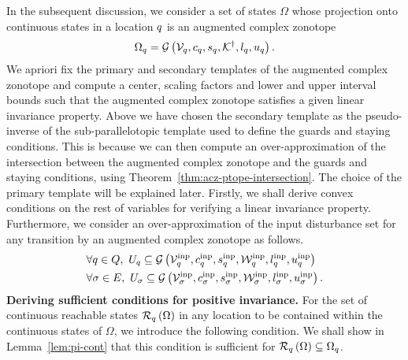 In the subsequent discussion, we consider a set of states $\Omega$ whose
projection onto continuous states in a location $q$ is an augmented
complex zonotope
%
\[
\Omega_q=\mathcal{G}\left(\mathcal{V}_q,c_q,s_q,{\mathcal{K}}^\dagger,l_q,u_q\right).
\]
%
We apriori fix the primary and secondary templates of the augmented
complex zonotope and compute a center, scaling factors and lower and
upper interval bounds such that the augmented complex zonotope
satisfies a given linear invariance property.  Above we have chosen
the secondary template as the pseudo-inverse of the sub-parallelotopic
template used to define the guards and staying conditions.  This is
because we can then compute an over-approximation of the intersection
between the augmented complex zonotope and the guards and staying
conditions, using Theorem~\ref{thm:acz-ptope-intersection}.  The choice
of the primary template will be explained later.  Firstly, we shall
derive convex conditions on the rest of variables for verifying a
linear invariance property.  Furthermore, we consider an
over-approximation of the input
disturbance set for any transition by an
augmented complex zonotope as follows.
%
\begin{align}
& \forall
q\in Q,~U_q\subseteq\mathcal{G}\left(\mathcal{V}^{\operatorname{inp}}_q,c^{\operatorname{inp}}_q,s^{\operatorname{inp}}_q,\mathcal{W}^{\operatorname{inp}}_q,l^{\operatorname{inp}}_q,u^{\operatorname{inp}}_q\right)\\
& \forall \sigma\in E,~U_\sigma\subseteq\mathcal{G}\left(\mathcal{V}^{\operatorname{inp}}_\sigma,c^{\operatorname{inp}}_\sigma,s^{\operatorname{inp}}_\sigma,\mathcal{W}^{\operatorname{inp}}_\sigma,l^{\operatorname{inp}}_\sigma,u^{\operatorname{inp}}_\sigma\right).
\end{align}
%
{\bf Deriving sufficient conditions for positive invariance.}  For the
set of continuous reachable states $\mathcal{R}_{q}\left(\Omega\right)$ in any
location to be contained within the continuous states of $\Omega$, we
introduce the following condition.  We shall show in
Lemma~\ref{lem:pi-cont} that this
condition is sufficient for
$\mathcal{R}_{q}\left(\Omega\right)\subseteq\Omega_q$.
%
